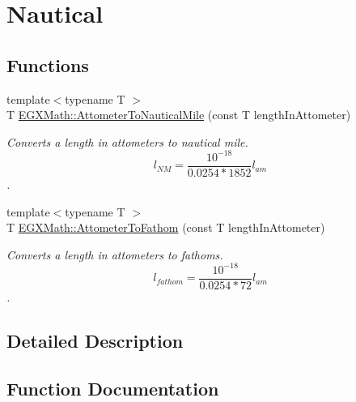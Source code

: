 \hypertarget{group___e_g_x_math-_conversions-_length_conversions-_s_i-_attometer-_nautical}{}\section{Nautical}
\label{group___e_g_x_math-_conversions-_length_conversions-_s_i-_attometer-_nautical}
\subsection*{Functions}
\begin{DoxyCompactItemize}
\item 
{\footnotesize template$<$typename T $>$ }\\T \mbox{\hyperlink{group___e_g_x_math-_conversions-_length_conversions-_s_i-_attometer-_nautical_ga38f0b72d347141e8740bcf9d84a08d25}{E\+G\+X\+Math\+::\+Attometer\+To\+Nautical\+Mile}} (const T length\+In\+Attometer)
\begin{DoxyCompactList}\small\item\em Converts a length in attometers to nautical mile. \[ l_{NM}= \frac{10^{-18}}{0.0254 * 1852} l_{am} \]. \end{DoxyCompactList}\item 
{\footnotesize template$<$typename T $>$ }\\T \mbox{\hyperlink{group___e_g_x_math-_conversions-_length_conversions-_s_i-_attometer-_nautical_ga969bc018e3f734e6c4012502d9c6c801}{E\+G\+X\+Math\+::\+Attometer\+To\+Fathom}} (const T length\+In\+Attometer)
\begin{DoxyCompactList}\small\item\em Converts a length in attometers to fathoms. \[ l_{fathom}= \frac{10^{-18}}{0.0254 * 72} l_{am} \]. \end{DoxyCompactList}\end{DoxyCompactItemize}


\subsection{Detailed Description}


\subsection{Function Documentation}
\mbox{\label{group___e_g_x_math-_conversions-_length_conversions-_s_i-_attometer-_nautical_ga969bc018e3f734e6c4012502d9c6c801}} 
